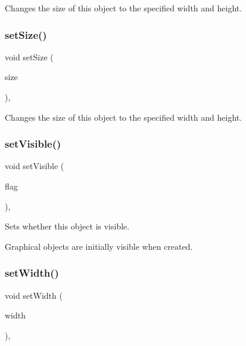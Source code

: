 Changes the size of this object to the specified width and height. 

\mbox{\label{classGObject_ae2b628228f192c2702c4ce941b2af68f}} 
\subsubsection{\texorpdfstring{set\+Size()}{setSize()}\hspace{0.1cm}{\footnotesize\ttfamily [2/2]}}
{\footnotesize\ttfamily void set\+Size (\begin{DoxyParamCaption}\item[{const \mbox{\hyperlink{classGDimension}{G\+Dimension}} \&}]{size }\end{DoxyParamCaption})\hspace{0.3cm}{\ttfamily [virtual]}, {\ttfamily [inherited]}}



Changes the size of this object to the specified width and height. 

\mbox{\label{classGObject_a88203f28224315d9f4471212f4af8ed3}} 
\subsubsection{\texorpdfstring{set\+Visible()}{setVisible()}}
{\footnotesize\ttfamily void set\+Visible (\begin{DoxyParamCaption}\item[{bool}]{flag }\end{DoxyParamCaption})\hspace{0.3cm}{\ttfamily [virtual]}, {\ttfamily [inherited]}}



Sets whether this object is visible. 

Graphical objects are initially visible when created. \mbox{\label{classGObject_aa3f3fba4cb131baa8696ba01e3bceca1}} 
\subsubsection{\texorpdfstring{set\+Width()}{setWidth()}}
{\footnotesize\ttfamily void set\+Width (\begin{DoxyParamCaption}\item[{double}]{width }\end{DoxyParamCaption})\hspace{0.3cm}{\ttfamily [virtual]}, {\ttfamily [inherited]}}



